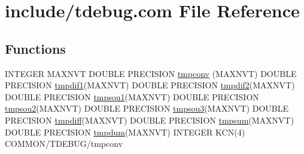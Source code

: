 \hypertarget{home_2abonfi_2_c_f_d__codes_2_eul_f_s_83_84_2include_2tdebug_8com}{\section{include/tdebug.com File Reference}
\label{home_2abonfi_2_c_f_d__codes_2_eul_f_s_83_84_2include_2tdebug_8com}
}
\subsection*{Functions}
\begin{DoxyCompactItemize}
\item 
I\-N\-T\-E\-G\-E\-R M\-A\-X\-N\-V\-T D\-O\-U\-B\-L\-E P\-R\-E\-C\-I\-S\-I\-O\-N \hyperlink{home_2abonfi_2_c_f_d__codes_2_eul_f_s_83_84_2include_2tdebug_8com_afd5e6e7ac20f6e7f0166c993ec74b22e}{tmpconv} (M\-A\-X\-N\-V\-T) D\-O\-U\-B\-L\-E P\-R\-E\-C\-I\-S\-I\-O\-N \hyperlink{msa20_2home_2abonfi_2_c_f_d__codes_2_eul_f_s_83_82_83_2include_2tdebug_8com_a7d0989f9a38016617ca1bc61561d66ff}{tmpdif1}(M\-A\-X\-N\-V\-T) D\-O\-U\-B\-L\-E P\-R\-E\-C\-I\-S\-I\-O\-N \hyperlink{msa20_2home_2abonfi_2_c_f_d__codes_2_eul_f_s_83_82_83_2include_2tdebug_8com_ab964a6f708f4f29204794080b9468323}{tmpdif2}(M\-A\-X\-N\-V\-T) D\-O\-U\-B\-L\-E P\-R\-E\-C\-I\-S\-I\-O\-N \hyperlink{msa20_2home_2abonfi_2_c_f_d__codes_2_eul_f_s_83_82_83_2include_2tdebug_8com_a023b3a6f5da0440dce335a556cb89fe6}{tmpsou1}(M\-A\-X\-N\-V\-T) D\-O\-U\-B\-L\-E P\-R\-E\-C\-I\-S\-I\-O\-N \hyperlink{msa20_2home_2abonfi_2_c_f_d__codes_2_eul_f_s_83_82_83_2include_2tdebug_8com_a7e31143aa010697a65a7ffe87ef242e7}{tmpsou2}(M\-A\-X\-N\-V\-T) D\-O\-U\-B\-L\-E P\-R\-E\-C\-I\-S\-I\-O\-N \hyperlink{msa20_2home_2abonfi_2_c_f_d__codes_2_eul_f_s_83_82_83_2include_2tdebug_8com_aa8356e45fafae8344ea4ae9ccfe00326}{tmpsou3}(M\-A\-X\-N\-V\-T) D\-O\-U\-B\-L\-E P\-R\-E\-C\-I\-S\-I\-O\-N \hyperlink{msa20_2home_2abonfi_2_c_f_d__codes_2_eul_f_s_83_82_83_2include_2tdebug_8com_a5fcc422c86549ee48051b12b4b0b9003}{tmpdiff}(M\-A\-X\-N\-V\-T) D\-O\-U\-B\-L\-E P\-R\-E\-C\-I\-S\-I\-O\-N \hyperlink{msa20_2home_2abonfi_2_c_f_d__codes_2_eul_f_s_83_82_83_2include_2tdebug_8com_af2cc9aa6a0cb8a889362cdb7fc0977ea}{tmpsum}(M\-A\-X\-N\-V\-T) D\-O\-U\-B\-L\-E P\-R\-E\-C\-I\-S\-I\-O\-N \hyperlink{msa20_2home_2abonfi_2_c_f_d__codes_2_eul_f_s_83_82_83_2include_2tdebug_8com_a85a53731c75ba4f8b2fb687cdcbe3f66}{tmpdum}(M\-A\-X\-N\-V\-T) I\-N\-T\-E\-G\-E\-R K\-C\-N(4) C\-O\-M\-M\-O\-N/T\-D\-E\-B\-U\-G/tmpconv
\end{DoxyCompactItemize}
